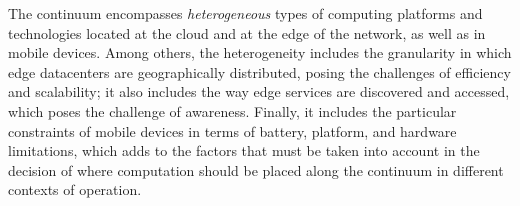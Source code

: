 
The continuum encompasses \textit{heterogeneous} types of computing platforms and technologies located at the cloud and at the edge of the network, as well as in mobile devices. Among others, the heterogeneity includes the granularity in which edge datacenters are geographically distributed, posing the challenges of efficiency and scalability; it also includes the way edge services are discovered and accessed, which poses the challenge of awareness. Finally, it includes the particular constraints of mobile devices in terms of battery, platform, and hardware limitations, which adds to the factors that must be taken into account in the decision of where computation should be placed along the continuum in different contexts of operation.








